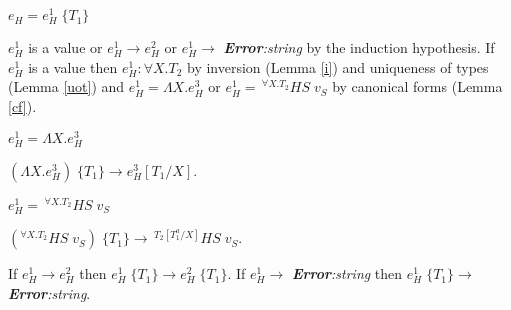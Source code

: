 \begin{case}
$e_{H}=e_{H}^{1}\;\lbrace T_{1}\rbrace$

$e_{H}^{1}$ is a value or $e_{H}^{1}\rightarrow e_{H}^{2}$ or $e_{H}^{1}\rightarrow$ \emph{\textbf{Error}:\;string} by the induction hypothesis.  If $e_{H}^{1}$ is a value then $e_{H}^{1}:\forall X.T_{2}$ by inversion (Lemma \ref{i}) and uniqueness of types (Lemma \ref{uot}) and $e_{H}^{1}=\Lambda X.e_{H}^{3}$ or $e_{H}^{1}=\,^{\forall X.T_{2}}HS\;v_{S}$ by canonical forms (Lemma \ref{cf}).
\begin{subcase}
$e_{H}^{1}=\Lambda X.e_{H}^{3}$

$(\Lambda X.e_{H}^{3})\;\lbrace T_{1}\rbrace\rightarrow e_{H}^{3}[T_{1}/X]$.
\end{subcase}
\begin{subcase}
$e_{H}^{1}=\,^{\forall X.T_{2}}HS\;v_{S}$

$(^{\forall X.T_{2}}HS\;v_{S})\;\lbrace T_{1}\rbrace\rightarrow\,^{T_{2}[T_{1}^{a}/X]}HS\;v_{S}$.
\end{subcase}
If $e_{H}^{1}\rightarrow e_{H}^{2}$ then $e_{H}^{1}\;\lbrace T_{1}\rbrace\rightarrow e_{H}^{2}\;\lbrace T_{1}\rbrace$.  If $e_{H}^{1}\rightarrow$ \emph{\textbf{Error}:\;string} then $e_{H}^{1}\;\lbrace T_{1}\rbrace\rightarrow$ \emph{\textbf{Error}:\;string}.
\end{case}